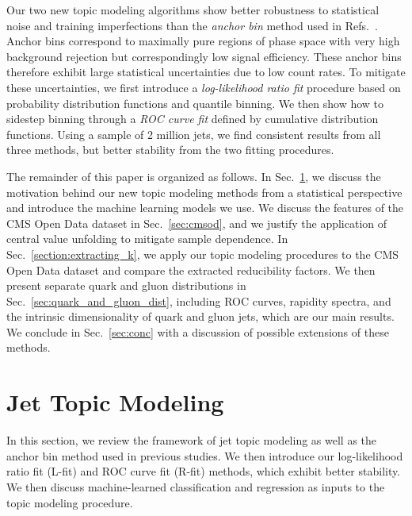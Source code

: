 \documentclass[aps,prd,twocolumn,preprintnumbers,nofootinbib,longbibliography,floatfix]{revtex4-1}
\DeclareRobustCommand{\Sec}[1]{Sec.~\ref{#1}}
\DeclareRobustCommand{\Refs}[1]{Refs.~\cite{#1}}
\begin{document}
Our two new topic modeling algorithms show better robustness to statistical noise and training imperfections than the \emph{anchor bin} method used in \Refs{Metodiev:2018ftz,Komiske:2018vkc,ATLAS:2019rqw,radha_phdthesis}.
%
Anchor bins correspond to maximally pure regions of phase space with very high background rejection but correspondingly low signal efficiency.
%
These anchor bins therefore exhibit large statistical uncertainties due to low count rates.
%
To mitigate these uncertainties, we first introduce a \emph{log-likelihood ratio fit} procedure based on probability distribution functions and quantile binning.
%
We then show how to sidestep binning through a \emph{ROC curve fit} defined by cumulative distribution functions.
%
Using a sample of 2 million jets, we find consistent results from all three methods, but better stability from the two fitting procedures.


The remainder of this paper is organized as follows. 
%
In \Sec{sec:theory}, we discuss the motivation behind our new topic modeling methods from a statistical perspective and introduce the machine learning models we use.
%
We discuss the features of the CMS Open Data dataset in \Sec{sec:cmsod}, and we justify the application of central value unfolding to mitigate sample dependence.
% 
In \Sec{section:extracting_k}, we apply our topic modeling procedures to the CMS Open Data dataset and compare the extracted reducibility factors.
%
We then present separate quark and gluon distributions in \Sec{sec:quark_and_gluon_dist}, including ROC curves, rapidity spectra, and the intrinsic dimensionality of quark and gluon jets, which are our main results.
%
We conclude in \Sec{sec:conc} with a discussion of possible extensions of these methods.



\section{Jet Topic Modeling} \label{sec:theory}


In this section, we review the framework of jet topic modeling as well as the anchor bin method used in previous studies.
%
We then introduce our log-likelihood ratio fit (L-fit) and ROC curve fit (R-fit) methods, which exhibit better stability.
%
We then discuss machine-learned classification and regression as inputs to the topic modeling procedure.
\end{document}
